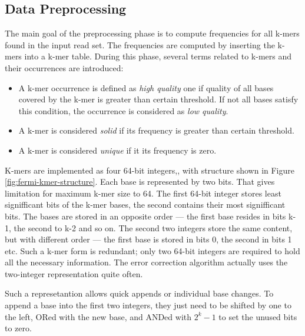 \subsection{Data Preprocessing}
\label{subsec:fermi-data-preprocessing}

The main goal of the preprocessing phase is to compute frequencies for all k-mers found in the input read set. The frequencies are computed by inserting the k-mers into a k-mer table. During this phase, several terms related to k-mers and their occurrences are introduced:
\begin{itemize}
\item A k-mer occurrence is defined as \textit{high quality} one if quality of all bases covered by the k-mer is greater than certain threshold. If not all bases satisfy this condition, the occurrence is considered as \textit{low quality}.
\item A k-mer is considered \textit{solid} if its frequency is greater than certain threshold.
\item A k-mer is considered \textit{unique} if it its frequency is zero.
\end{itemize}
K-mers are implemented as four 64-bit integers,, with structure shown in Figure \ref{fig:fermi-kmer-structure}. Each base is represented by two bits. That gives limitation for maximum k-mer size to 64. The first 64-bit integer stores least signifficant bits of the k-mer bases, the second contains their most signifficant bits. The bases are stored in an opposite order --- the first base resides in bits k-1, the second to k-2 and so on. The second two integers store the same content, but with different order --- the first base is stored in bits 0, the second in bits 1 etc. Such a k-mer form is redundant; only two 64-bit integers are required to hold all the necessary information. The error correction algorithm actually uses the two-integer representation quite often.

Such a represetantion allows quick appends or individual base changes. To append a base into the first two integers, they just need to be shifted by one to the left, ORed with the new base, and ANDed with $2^k-1$ to set the unused bits to zero.

